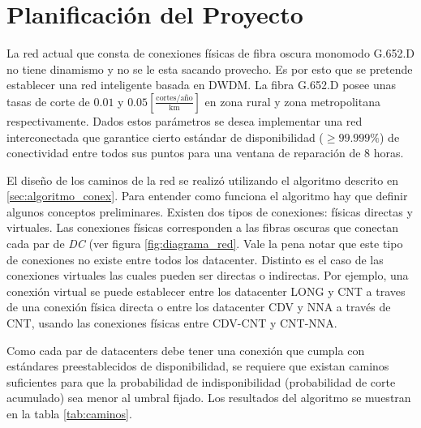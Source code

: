 \section{Planificaci\'on del Proyecto}\label{sec:planificacion}

La red actual que consta de conexiones físicas de fibra oscura monomodo G.652.D no tiene dinamismo y no se le esta sacando provecho. Es por esto que se pretende establecer una red inteligente basada en DWDM. La fibra G.652.D posee unas tasas de corte de $0.01$ y $0.05 [\frac{\text{cortes}/\text{año}}{\text{km}}]$ en zona rural y zona metropolitana respectivamente. Dados estos parámetros se desea implementar una red interconectada que garantice cierto estándar de disponibilidad ($\geq 99.999\%$) de conectividad entre todos sus puntos para una ventana de reparación de $8$ horas.

El diseño de los caminos de la red se realizó utilizando el algoritmo descrito en \ref{sec:algoritmo_conex}. Para entender como funciona el algoritmo hay que definir algunos conceptos preliminares. Existen dos tipos de conexiones: físicas directas y virtuales. Las conexiones físicas corresponden a las fibras oscuras que conectan cada par de \emph{DC} (ver figura \ref{fig:diagrama_red}. Vale la pena notar que este tipo de conexiones no existe entre todos los datacenter. Distinto es el caso de las conexiones virtuales las cuales pueden ser directas o indirectas. Por ejemplo, una conexión virtual se puede establecer entre los datacenter LONG y CNT a traves de una conexión física directa o entre los datacenter CDV y NNA a través de CNT, usando las conexiones físicas entre CDV-CNT y CNT-NNA.

Como cada par de datacenters debe tener una conexión que cumpla con estándares preestablecidos de disponibilidad, se requiere que existan caminos suficientes para que la probabilidad de indisponibilidad (probabilidad de corte acumulado) sea menor al umbral fijado. Los resultados del algoritmo se muestran en la tabla \ref{tab:caminos}.

